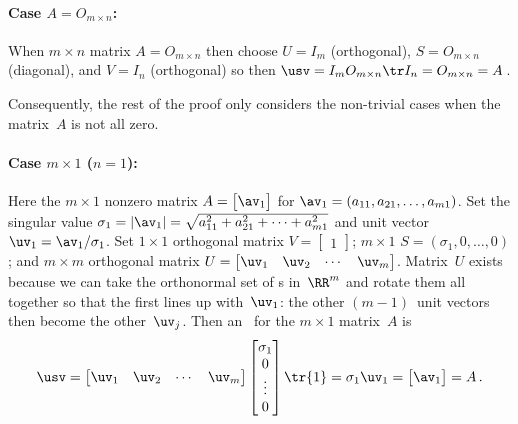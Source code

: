 \paragraph{Case $A=O_{m\times n}$:}
When \(m\times n\) matrix \(A=O_{m\times n}\) then choose \(U=I_m\) (orthogonal), \(S=O_{m\times n}\) (diagonal), and \(V=I_n\) (orthogonal) so then \(\usv=I_mO_{m\times n}\tr I_n=O_{m\times n}=A\)\,.  

Consequently, the rest of the proof only considers the non-trivial cases when the matrix~\(A\) is not all zero. 



\paragraph{Case $m\times 1$ ($n=1$):}
Here the \(m\times 1\) nonzero matrix \(A=\begin{bmatrix} \av_1 \end{bmatrix}\) for \(\av_1=(a_{11},a_{21},\ldots,a_{m1})\).
Set the singular value \(\sigma_1=|\av_1|=\sqrt{a_{11}^2+a_{21}^2+\cdots+a_{m1}^2}\) and unit vector \(\uv_1=\av_1/\sigma_1\).
Set \(1\times 1\) orthogonal matrix \(V=\begin{bmatrix} 1 \end{bmatrix}\);
\(m\times 1\)  
\(S=(\sigma_1,0,\ldots,0)\); and
\(m\times m\) orthogonal matrix \(U=\begin{bmatrix} \uv_1 &\uv_2&\cdots&\uv_m\end{bmatrix}\).
Matrix~\(U\) exists because we can take the orthonormal set of s in~\(\RR^m\) and rotate them all together so that the first lines up with~\(\uv_1\): the other \((m-1)\)~unit vectors then become the other~\(\uv_j\).
Then an \svd\ for the \(m\times1\) matrix~\(A\) is
\begin{equation*}
\usv
=\begin{bmatrix} \uv_1 &\uv_2&\cdots&\uv_m\end{bmatrix}
\begin{bmatrix} \sigma_1\\0\\\vdots\\0 \end{bmatrix}
\tr{1}
=\sigma_1{\uv_1}
=\begin{bmatrix} \av_1 \end{bmatrix}
=A\,.
\end{equation*}

